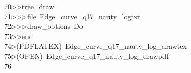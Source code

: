 \begin{tabbing}
70\>$\triangleright$\>$\triangleright$\>tree\_draw\ \\[0pt]
71\>$\triangleright$\>$\triangleright$\>$\triangleright$\>file\ Edge\_curve\_q17\_nauty\_logtxt\ \\[0pt]
72\>$\triangleright$\>$\triangleright$\>$\triangleright$\>draw\_options\ Do\ \\[0pt]
73\>$\triangleright$\>$\triangleright$\>end\\[0pt]
74\>$\triangleright$\>(PDFLATEX)\ Edge\_curve\_q17\_nauty\_log\_drawtex\\[0pt]
75\>$\triangleright$\>(OPEN)\ Edge\_curve\_q17\_nauty\_log\_drawpdf\\[0pt]
76\>\end{tabbing}
